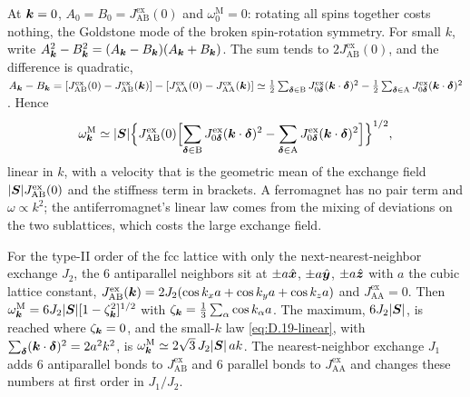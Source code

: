 At $\bm{k} = 0$, $A_0 = B_0 = J^{\mathrm{ex}}_{\mathrm{AB}}(0)$ and $\omega^{\mathrm{M}}_0 = 0$: rotating all spins together costs nothing, the Goldstone mode of the broken spin-rotation symmetry. For small $k$, write $A_{\bm{k}}^2 - B_{\bm{k}}^2 = (A_{\bm{k}} - B_{\bm{k}})(A_{\bm{k}} + B_{\bm{k}})$. The sum tends to $2J^{\mathrm{ex}}_{\mathrm{AB}}(0)$, and the difference is quadratic, $A_{\bm{k}} - B_{\bm{k}} = [J^{\mathrm{ex}}_{\mathrm{AB}}(0) - J^{\mathrm{ex}}_{\mathrm{AB}}(\bm{k})] - [J^{\mathrm{ex}}_{\mathrm{AA}}(0) - J^{\mathrm{ex}}_{\mathrm{AA}}(\bm{k})] \simeq \frac12\sum_{\bm{\delta}\in\mathrm{B}}J^{\mathrm{ex}}_{0\bm{\delta}}(\bm{k}\cdot\bm{\delta})^2 - \frac12\sum_{\bm{\delta}\in\mathrm{A}}J^{\mathrm{ex}}_{0\bm{\delta}}(\bm{k}\cdot\bm{\delta})^2$. Hence
\begin{equation}
  \omega^{\mathrm{M}}_{\bm{k}} \simeq |\bm{S}|\Bigl\{J^{\mathrm{ex}}_{\mathrm{AB}}(0)\Bigl[\sum_{\bm{\delta}\in\mathrm{B}}J^{\mathrm{ex}}_{0\bm{\delta}}(\bm{k}\cdot\bm{\delta})^2 - \sum_{\bm{\delta}\in\mathrm{A}}J^{\mathrm{ex}}_{0\bm{\delta}}(\bm{k}\cdot\bm{\delta})^2\Bigr]\Bigr\}^{1/2} ,
  \label{eq:D.19-linear}
\end{equation}
linear in $k$, with a velocity that is the geometric mean of the exchange field $|\bm{S}|J^{\mathrm{ex}}_{\mathrm{AB}}(0)$ and the stiffness term in brackets. A ferromagnet has no pair term and $\omega \propto k^2$; the antiferromagnet's linear law comes from the mixing of deviations on the two sublattices, which costs the large exchange field.

For the type-II order of the fcc lattice with only the next-nearest-neighbor exchange $J_2$, the 6 antiparallel neighbors sit at $\pm a\hat{\bm{x}}$, $\pm a\hat{\bm{y}}$, $\pm a\hat{\bm{z}}$ with $a$ the cubic lattice constant, $J^{\mathrm{ex}}_{\mathrm{AB}}(\bm{k}) = 2J_2(\cos k_xa + \cos k_ya + \cos k_za)$ and $J^{\mathrm{ex}}_{\mathrm{AA}} = 0$. Then $\omega^{\mathrm{M}}_{\bm{k}} = 6J_2|\bm{S}|[1 - \zeta_{\bm{k}}^2]^{1/2}$ with $\zeta_{\bm{k}} = \frac13\sum_\alpha\cos k_\alpha a$. The maximum, $6J_2|\bm{S}|$, is reached where $\zeta_{\bm{k}} = 0$, and the small-$k$ law \cref{eq:D.19-linear}, with $\sum_{\bm{\delta}}(\bm{k}\cdot\bm{\delta})^2 = 2a^2k^2$, is $\omega^{\mathrm{M}}_{\bm{k}} \simeq 2\sqrt3\,J_2|\bm{S}|\,ak$. The nearest-neighbor exchange $J_1$ adds 6 antiparallel bonds to $J^{\mathrm{ex}}_{\mathrm{AB}}$ and 6 parallel bonds to $J^{\mathrm{ex}}_{\mathrm{AA}}$ and changes these numbers at first order in $J_1/J_2$.

